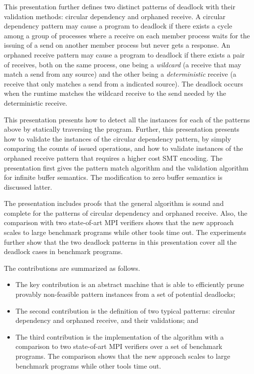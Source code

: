 This presentation further defines two distinct patterns of deadlock with their validation methods: circular dependency and orphaned receive. A circular dependency pattern may cause a program to deadlock if there exists a cycle among a group of processes where a receive on each member process waits for the issuing of a send on another member process but never gets a response. An orphaned receive pattern may cause a program to deadlock if there exists a pair of receives, both on the same process, one being a \emph{wildcard} (a receive that may match a send from any source) and the other being a \emph{deterministic} receive (a receive that only matches a send from a indicated source). The deadlock occurs when the runtime matches the wildcard receive to the send needed by the deterministic receive. 

This presentation presents how to detect all the instances for each of the patterns above by statically traversing the program. Further, this presentation presents how to validate the instances of the circular dependency pattern, by simply comparing the counts of issued operations, and how to validate instances of the orphaned receive pattern that requires a higher cost SMT encoding. The presentation first gives the pattern match algorithm and the validation algorithm for infinite buffer semantics. The modification to zero buffer semantics is discussed latter.  

The presentation includes proofs that the general algorithm is sound and complete for the patterns of circular dependency and orphaned receive. Also, the comparison with two state-of-art MPI verifiers shows that the new approach scales to large benchmark programs while other tools time out. The experiments further show that the two deadlock patterns in this presentation cover all the deadlock cases in benchmark programs.


The contributions are summarized as follows.
\begin{itemize}
\item The key contribution is an abstract machine that is able to efficiently prune provably non-feasible pattern instances from a set of potential deadlocks; 
\item The second contribution is the definition of two typical patterns: circular dependency and orphaned receive, and their validations; and
\item The third contribution is the implementation of the algorithm with a comparison to two state-of-art MPI verifiers over a set of benchmark programs. The comparison shows that the new approach scales to large benchmark programs while other tools time out.
\end{itemize}

